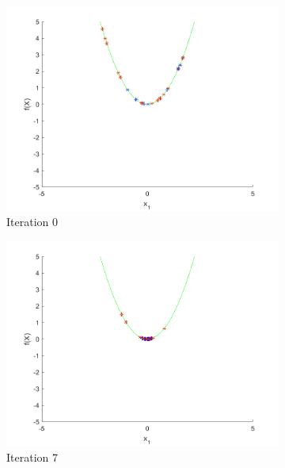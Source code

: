 \begin{figure}
  \begin{subfigure}[b]{0.4\textwidth}
    \includegraphics[width=\textwidth]{img/smpl/circ/loa-iter-0}
    \caption{Iteration 0}
    \label{fig:s1-iter-0}
  \end{subfigure}
  \begin{subfigure}[b]{0.4\textwidth}
    \includegraphics[width=\textwidth]{img/smpl/circ/loa-iter-7}
    \caption{Iteration 7}
    \label{fig:s1-iter-1}
  \end{subfigure}
  \begin{subfigure}[b]{0.4\textwidth}

\end{subfigure}
\end{figure}
